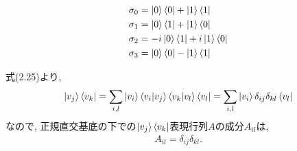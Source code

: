 \begin{ex}
    \label{ex2.9}
    \begin{align*}
        \sigma_0 & = \ket{0}\bra{0} + \ket{1}\bra{1}      \\
        \sigma_1 & = \ket{0}\bra{1} + \ket{1}\bra{0}      \\
        \sigma_2 & = -i \ket{0}\bra{1} + i \ket{1}\bra{0} \\
        \sigma_3 & = \ket{0}\bra{0} - \ket{1}\bra{1}
    \end{align*}
\end{ex}

\begin{ex}
    \label{ex2.10}
    式(2.25)より,
    \begin{align*}
        \ket{v_j}\bra{v_k}
        = \sum_{i,l} \ket{v_i}\braket{v_i|v_j}\braket{v_k|v_l}\bra{v_l}
        = \sum_{i,l} \ket{v_i}\delta_{ij}\delta_{kl}\bra{v_l}
    \end{align*}
    なので, 正規直交基底の下での$\ket{v_j}\bra{v_k}$表現行列$A$の成分$A_{il}$は,
    \begin{align*}
        A_{il} = \delta_{ij}\delta_{kl}.
    \end{align*}
\end{ex}

